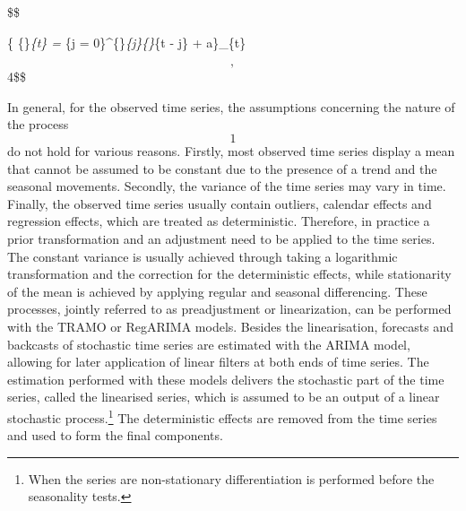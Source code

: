 \documentclass[
  letterpaper,
  DIV=11,
  numbers=noendperiod]{scrreprt}
\begin{document}
\$\$

\{ \{\}\emph{\{t\} = \sum}\{j =
0\}\^{}\{\infty\}\pi\emph{\{j\}\{\}}\{t - j\} + a\}\_\{t\}

\[, \]4\$\$

In general, for the observed time series, the assumptions concerning the
nature of the process \[1\] do not hold for various reasons. Firstly,
most observed time series display a mean that cannot be assumed to be
constant due to the presence of a trend and the seasonal movements.
Secondly, the variance of the time series may vary in time. Finally, the
observed time series usually contain outliers, calendar effects and
regression effects, which are treated as deterministic. Therefore, in
practice a prior transformation and an adjustment need to be applied to
the time series. The constant variance is usually achieved through
taking a logarithmic transformation and the correction for the
deterministic effects, while stationarity of the mean is achieved by
applying regular and seasonal differencing. These processes, jointly
referred to as preadjustment or linearization, can be performed with the
TRAMO or RegARIMA models. Besides the linearisation, forecasts and
backcasts of stochastic time series are estimated with the ARIMA model,
allowing for later application of linear filters at both ends of time
series. The estimation performed with these models delivers the
stochastic part of the time series, called the linearised series, which
is assumed to be an output of a linear stochastic process.\footnote{When
  the series are non-stationary differentiation is performed before the
  seasonality tests.} The deterministic effects are removed from the
time series and used to form the final components.
\end{document}
